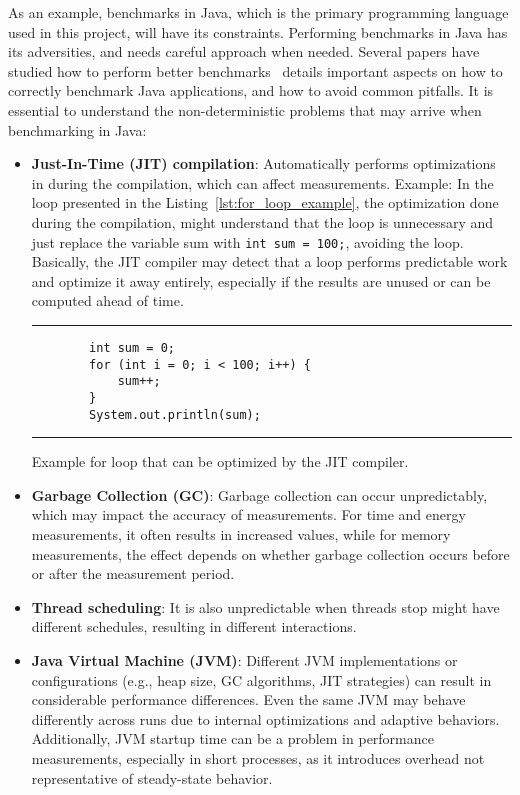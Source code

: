 As an example, benchmarks in Java, which is the primary programming language used in this project, will have its constraints. Performing benchmarks in Java has its adversities, and needs careful approach when needed. Several papers have studied how to perform better benchmarks~\cite{10.1145/1297027.1297033,10.1145/1167515.1167488} details important aspects on how to correctly benchmark Java applications, and how to avoid common pitfalls.
It is essential to understand the non-deterministic problems that may arrive when benchmarking in Java:


\begin{itemize}
    \item \textbf{Just-In-Time (JIT) compilation}: Automatically performs optimizations in during the compilation, which can affect measurements. Example: In the loop presented in the Listing~\ref{lst:for_loop_example}, the optimization done during the compilation, might understand that the loop is unnecessary and just replace the variable sum with \texttt{int sum = 100;}, avoiding the loop. Basically, the JIT compiler may detect that a loop performs predictable work and optimize it away entirely, especially if the results are unused or can be computed ahead of time.
    
    \begin{listing}[H]
    \noindent\rule{\linewidth}{0.4pt}
    \begin{verbatim}
        int sum = 0;
        for (int i = 0; i < 100; i++) {
            sum++;
        }
        System.out.println(sum);
    \end{verbatim}
    \noindent\rule{\linewidth}{0.4pt}
    \caption{Example for loop that can be optimized by the JIT compiler.}            
    \label{lst:for_loop_example}
    \end{listing}

    
    \item \textbf{Garbage Collection (GC)}: Garbage collection can occur unpredictably, which may impact the accuracy of measurements. For time and energy measurements, it often results in increased values, while for memory measurements, the effect depends on whether garbage collection occurs before or after the measurement period.
    
    \item \textbf{Thread scheduling}: It is also unpredictable when threads stop might have different schedules, resulting in different interactions.
    
    \item \textbf{Java Virtual Machine (JVM)}: Different JVM implementations or configurations (e.g., heap size, GC algorithms, JIT strategies) can result in considerable performance differences. Even the same JVM may behave differently across runs due to internal optimizations and adaptive behaviors. Additionally, JVM startup time can be a problem in performance measurements, especially in short processes, as it introduces overhead not representative of steady-state behavior.

\end{itemize}


